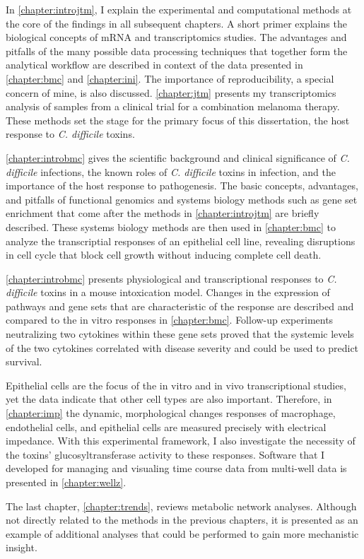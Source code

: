 In \autoref{chapter:introjtm}, I explain the experimental and computational
methods at the core of the findings in all subsequent chapters.
A short primer explains the biological concepts of mRNA and transcriptomics
studies. The advantages and pitfalls of the many possible data processing
techniques that together form the analytical workflow are described in context
of the data presented in \autoref{chapter:bmc} and \autoref{chapter:ini}. 
The importance of reproducibility, a special concern of mine, is also 
discussed. \autoref{chapter:jtm} presents my transcriptomics analysis of
samples from a clinical trial for a combination melanoma therapy.
These methods set the stage for the primary focus of this dissertation,
the host response to \textit{C. difficile} toxins.

\autoref{chapter:introbmc} gives the scientific background
and clinical significance of \textit{C. difficile} infections, 
the known roles of \textit{C. difficile} toxins in infection,
and the importance of the host response to pathogenesis.
The basic concepts, advantages, and pitfalls of functional genomics 
and systems biology methods such as
gene set enrichment that come after the methods in \autoref{chapter:introjtm}
are briefly described. These systems biology methods are then used in \autoref{chapter:bmc}
to analyze the transcriptial responses of an epithelial cell line, revealing
disruptions in cell cycle that block cell growth without inducing
complete cell death.

\autoref{chapter:introbmc} presents physiological 
and transcriptional responses to \textit{C. difficile} toxins
in a mouse intoxication model. Changes in the expression of pathways and gene sets that
are characteristic of the response are described and compared to
the in vitro responses in \autoref{chapter:bmc}.
Follow-up experiments neutralizing two cytokines within
these gene sets proved that the systemic levels of the two cytokines
correlated with disease severity and could be used to
predict survival.

Epithelial cells are the focus of the in vitro and in vivo
transcriptional studies, yet the data indicate that other cell types
are also important. Therefore, in \autoref{chapter:imp}
the dynamic, morphological changes responses of macrophage, endothelial cells, 
and epithelial
cells are measured precisely with electrical impedance.
With this experimental framework, I also investigate the necessity
of the toxins' glucosyltransferase activity to these responses.
Software that I developed for managing and visualing time course data from
multi-well data is presented in \autoref{chapter:wellz}.

The last chapter, \autoref{chapter:trends}, reviews
metabolic network analyses. Although not directly related to
the methods in the previous chapters, it is presented as an
example of additional analyses that could be performed
to gain more mechanistic insight.



